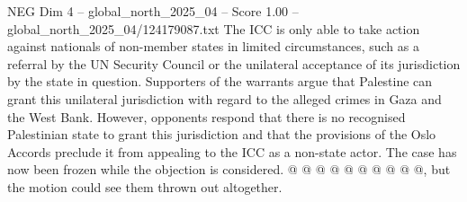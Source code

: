 \begin{textsample}{NEG Dim 4 – global\_north\_2025\_04 – Score 1.00 – global\_north\_2025\_04/124179087.txt}
The ICC is only able to take action against nationals of non-member states in limited circumstances, such as a referral by the UN Security Council or the unilateral acceptance of its jurisdiction by the state in question.
Supporters of the warrants argue that Palestine can grant this unilateral jurisdiction with regard to the alleged crimes in Gaza and the West Bank.
However, opponents respond that there is no recognised Palestinian state to grant this jurisdiction and that the provisions of the Oslo Accords preclude it from appealing to the ICC as a non-state actor.
The case has now been frozen while the objection is considered. @ @ @ @ @ @ @ @ @ @, but the motion could see them thrown out altogether.

\end{textsample}
